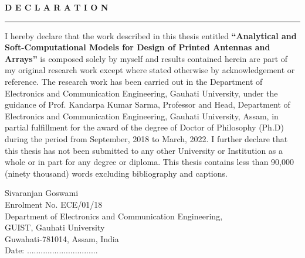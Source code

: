\begin{center}
{\bf \large D E C L A R A T I O N}
\end{center}
\rule{\linewidth}{2mm} \pagestyle{empty} \vspace{0.25in}
\par

I hereby declare that the work described in this thesis entitled {\bf ``Analytical and Soft-Computational Models for Design of Printed Antennas and Arrays''} is composed solely by myself and results contained herein are part of my original research work except where stated otherwise by acknowledgement or reference. The research work has been carried out in the Department of Electronics and Communication Engineering, Gauhati University, under the guidance of Prof. Kandarpa Kumar Sarma, Professor and Head, Department of Electronics and Communication Engineering, Gauhati University, Assam, in partial fulfillment for the award of the degree of Doctor of Philosophy (Ph.D) during the period from September, 2018 to March, 2022. I further declare that this thesis has not been submitted to any other University or Institution as a whole or in part for any degree or diploma. This thesis contains less than 90,000 (ninety thousand) words excluding bibliography and captions.

\vspace*{30mm}



\bigskip\medskip

\noindent Sivaranjan Goswami\\ Enrolment No. ECE/01/18\\Department of Electronics and Communication Engineering, \\ GUIST, Gauhati University\\ Guwahati-781014, Assam, India\\
Date: ............................... \\

\noindent





